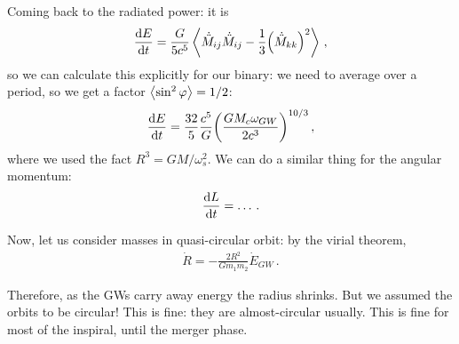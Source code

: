 \documentclass[main.tex]{subfiles}
\begin{document}
Coming back to the radiated power: it is 
%
\begin{align}
\dv{E}{t} = \frac{G}{5 c^{5}} \expval{\dot{\ddot{M}}_{ij} \dot{\ddot{M}}_{ij} - \frac{1}{3} \qty(\dot{\ddot{M}}_{kk})^2}
\,,
\end{align}
%
so we can calculate this explicitly for our binary: we need to average over a period, so we get a factor \(\expval{\sin^2\varphi } = 1/2\): 
%
\begin{align}
\dv{E}{t} = \frac{32}{5} \frac{c^{5}}{G} \qty(\frac{GM_c \omega_{GW}}{2 c^{3}})^{ 10 /3}
\,,
\end{align}
%
where we used the fact \(R^3 = GM / \omega_{s}^2\).
We can do a similar thing for the angular momentum: 
%
\begin{align}
\dv{L}{t} = \dots
\,.
\end{align}

Now, let us consider masses in quasi-circular orbit: by the virial theorem, 
%
\begin{align}
\dot{R} = - \frac{2R^2}{G m_1 m_2 } \dot{E}_{GW}
\,.
\end{align}

Therefore, as the GWs carry away energy the radius shrinks. 
But we assumed the orbits to be circular! This is fine: they are almost-circular usually. 
This is fine for most of the inspiral, until the merger phase. 
\end{document}
